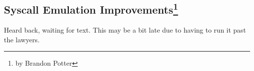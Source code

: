 \subsection[Syscall Emulation Improvements]{Syscall Emulation Improvements\footnote{by Brandon Potter}}

Heard back, waiting for text.
This may be a bit late due to having to run it past the lawyers.
